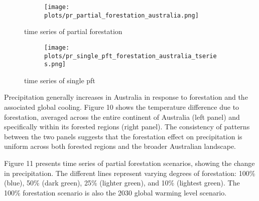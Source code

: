 \documentclass[]{article}
\begin{document}
\begin{figure}[H]
    \centering
    \begin{subfigure}[b]{\linewidth}
        \texttt{[image: plots/pr\_partial\_forestation\_australia.png]}
    \end{subfigure}
    \caption{time series of partial forestation}
    \label{fig:pr_australia_partial}
\end{figure}

\begin{figure}[H]
    \centering
    \begin{subfigure}[b]{\linewidth}
        \texttt{[image: plots/pr\_single\_pft\_forestation\_australia\_tseries.png]}
    \end{subfigure}
    \caption{time series of single pft}
    \label{fig:pr_australia_single}
\end{figure}

Precipitation generally increases in Australia in response to forestation and the associated global cooling.
Figure 10 shows the temperature difference due to forestation, averaged across the entire continent of Australia (left panel) and specifically within its forested regions (right panel).
The consistency of patterns between the two panels suggests that the forestation effect on precipitation is uniform across both forested regions and the broader Australian landscape.


Figure 11 presents time series of partial forestation scenarios, showing the change in precipitation. The different lines represent varying degrees of forestation: 100\% (blue), 50\% (dark green), 25\% (lighter green), and 10\% (lightest green).
The 100\% forestation scenario is also the 2030 global warming level scenario.


\end{document}
